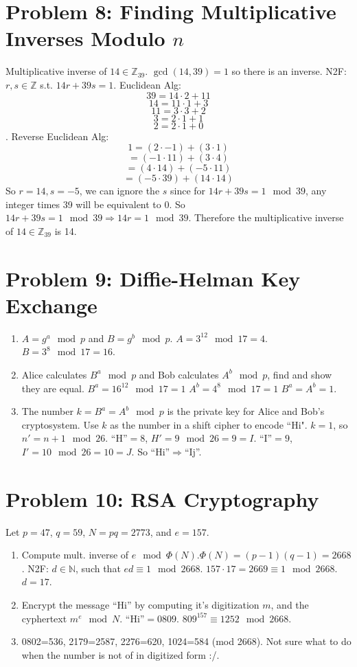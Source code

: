 \documentclass[12pt]{article}
\newcommand{\N}{\mathbb{N}}
\newcommand{\Z}{\mathbb{Z}}
\begin{document}
\section{Problem 8: Finding Multiplicative Inverses Modulo $n$}
Multiplicative inverse of $14\in\Z_{39}$. $\gcd(14,39)=1$ so there is an inverse. N2F: $r,s\in\Z$ s.t. $14r+39s=1$.
\newline Euclidean Alg:$$39=14\cdot2+11$$ $$14=11\cdot1+3$$ $$11=3\cdot3+2$$ $$3=2\cdot1+1$$ $$2=2\cdot1+0$$. Reverse Euclidean Alg: $$1=(2\cdot-1)+(3\cdot1)$$ $$=(-1\cdot11)+(3\cdot4)$$ $$=(4\cdot14)+(-5\cdot11)$$ $$=(-5\cdot39)+(14\cdot14)$$ So $r=14, s=-5$, we can ignore the $s$ since for $14r+39s=1\mod39$, any integer times 39 will be equivalent to 0. So $14r+39s=1\mod39\Longrightarrow14r=1\mod39$. Therefore the multiplicative inverse of $14\in\Z_{39}$ is 14.
\section{Problem 9: Diffie-Helman Key Exchange}
\begin{enumerate}
    \item $A=g^a\mod p$ and $B=g^b\mod p$.
    \newline $A=3^{12}\mod17=4$.
    \newline $B=3^8\mod17=16$.
    \item Alice calculates $B^a\mod p$ and Bob calculates $A^b\mod p$, find and show they are equal.
    \newline $B^a=16^{12}\mod17=1$
    \newline $A^b=4^8\mod17=1$
    \newline $B^a=A^b=1$.
    \item The number $k=B^a=A^b\mod p$ is the private key for Alice and Bob's cryptosystem. Use $k$ as the number in a shift cipher to encode ``Hi".
    \newline $k=1$, so $n'=n+1\mod26$. ``H''$=8$, $H'=9\mod26=9=I$. ``I''$=9$, $I'=10\mod26=10=J$. So ``Hi''$\Longrightarrow$``Ij''.
\end{enumerate}
\section{Problem 10: RSA Cryptography}
Let $p=47$, $q=59$, $N=pq=2773$, and $e=157$.
\begin{enumerate}
    \item Compute mult. inverse of $e\mod\Phi(N)$.\newline $\Phi(N)=(p-1)(q-1)=2668$. \newline N2F: $d\in\N$, such that $ed\equiv 1\mod2668$. $157\cdot17=2669\equiv1\mod2668$. $d=17$.
    \item Encrypt the message ``Hi'' by computing it's digitization $m$, and the cyphertext $m^e\mod N$.
    \newline ``Hi''$=0809$. $809^{157}\equiv1252\mod2668$.
    \item 0802=536, 2179=2587, 2276=620, 1024=584 (mod 2668). Not sure what to do when the number is not of in digitized form :/.
\end{enumerate}
\end{document}
